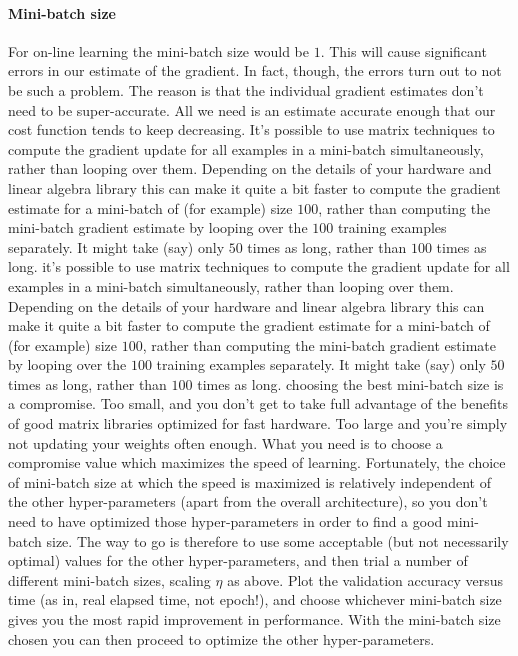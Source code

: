 \documentclass[12pt, letterpaper]{article}
\theoremstyle{definition}
\let\tb\textbf
\begin{document}
\paragraph{\tb{Mini-batch size}} For on-line learning the mini-batch size would be $1$. This will cause significant errors in our estimate of the gradient. In fact, though, the errors turn out to not be such a problem. The reason is that the individual gradient estimates don't need to be super-accurate. All we need is an estimate accurate enough that our cost function tends to keep decreasing. It's possible to use matrix techniques to compute the gradient update for all examples in a mini-batch simultaneously, rather than looping over them. Depending on the details of your hardware and linear algebra library this can make it quite a bit faster to compute the gradient estimate for a mini-batch of (for example) size $100$, rather than computing the mini-batch gradient estimate by looping over the $100$ training examples separately. It might take (say) only $50$
 times as long, rather than $100$ times as long.  it's possible to use matrix techniques to compute the gradient update for all examples in a mini-batch simultaneously, rather than looping over them. Depending on the details of your hardware and linear algebra library this can make it quite a bit faster to compute the gradient estimate for a mini-batch of (for example) size $100$, rather than computing the mini-batch gradient estimate by looping over the $100$ training examples separately. It might take (say) only $50$ times as long, rather than $100$ times as long. choosing the best mini-batch size is a compromise. Too small, and you don't get to take full advantage of the benefits of good matrix libraries optimized for fast hardware. Too large and you're simply not updating your weights often enough. What you need is to choose a compromise value which maximizes the speed of learning. Fortunately, the choice of mini-batch size at which the speed is maximized is relatively independent of the other hyper-parameters (apart from the overall architecture), so you don't need to have optimized those hyper-parameters in order to find a good mini-batch size. The way to go is therefore to use some acceptable (but not necessarily optimal) values for the other hyper-parameters, and then trial a number of different mini-batch sizes, scaling $\eta$ as above. Plot the validation accuracy versus time (as in, real elapsed time, not epoch!), and choose whichever mini-batch size gives you the most rapid improvement in performance. With the mini-batch size chosen you can then proceed to optimize the other hyper-parameters.
\end{document}
